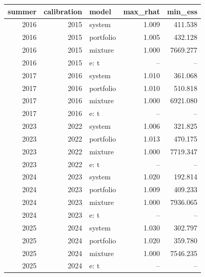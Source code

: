 \begin{tabular}{rrlrr}
\toprule
summer & calibration & model & max_rhat & min_ess \\
\midrule
2016 & 2015 & system & 1.009 & 411.538 \\
2016 & 2015 & portfolio & 1.005 & 432.128 \\
2016 & 2015 & mixture & 1.000 & 7669.277 \\
2016 & 2015 & e: t & -- & -- \\
2017 & 2016 & system & 1.010 & 361.068 \\
2017 & 2016 & portfolio & 1.010 & 510.818 \\
2017 & 2016 & mixture & 1.000 & 6921.080 \\
2017 & 2016 & e: t & -- & -- \\
2023 & 2022 & system & 1.006 & 321.825 \\
2023 & 2022 & portfolio & 1.013 & 470.175 \\
2023 & 2022 & mixture & 1.000 & 7719.347 \\
2023 & 2022 & e: t & -- & -- \\
2024 & 2023 & system & 1.020 & 192.814 \\
2024 & 2023 & portfolio & 1.009 & 409.233 \\
2024 & 2023 & mixture & 1.000 & 7936.065 \\
2024 & 2023 & e: t & -- & -- \\
2025 & 2024 & system & 1.030 & 302.797 \\
2025 & 2024 & portfolio & 1.020 & 359.780 \\
2025 & 2024 & mixture & 1.000 & 7546.235 \\
2025 & 2024 & e: t & -- & -- \\
\bottomrule
\end{tabular}
